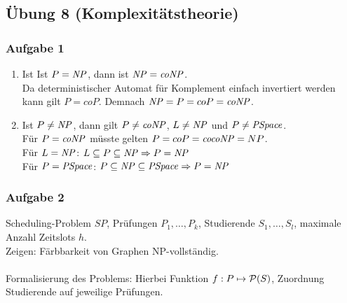 \subsection*{Übung 8 (Komplexitätstheorie)}
\subsubsection*{Aufgabe 1}
    \begin{enumerate}
        \item Ist Ist $P = \mathit{NP}$, dann ist $\mathit{NP} = \mathit{coNP}$. \\
            \LOES Da deterministischer Automat für Komplement einfach invertiert werden kann gilt $P = coP$. Demnach $\mathit{NP} = P = coP = \mathit{coNP}$.

        \item Ist $P \neq \mathit{NP}$, dann gilt $P \neq \mathit{coNP}$, $L \neq \mathit{NP}$ und $P \neq \mathit{PSpace}$. \\
            \LOES Für $P = \mathit{coNP}$ müsste gelten $P = coP = \mathit{cocoNP} = NP$. \\
            Für $L = \mathit{NP}$: $L \subseteq P \subseteq \mathit{NP} \Rightarrow P = \mathit{NP}$ \\
            Für $P = \mathit{PSpace}$: $P \subseteq \mathit{NP} \subseteq \mathit{PSpace} \Rightarrow P = \mathit{NP}$
    \end{enumerate}


\subsubsection*{Aufgabe 2}

    Scheduling-Problem $SP$, Prüfungen $P_{1}, \dots, P_{k}$, Studierende $S_{1}, \dots, S_{l}$, maximale Anzahl Zeitslots $h$. \\
    Zeigen: Färbbarkeit von Graphen NP-vollständig. \\

    \LOES \\
    Formalisierung des Problems:  Hierbei Funktion $f: P \mapsto \mathcal{P}(S)$, Zuordnung Studierende auf jeweilige Prüfungen.

